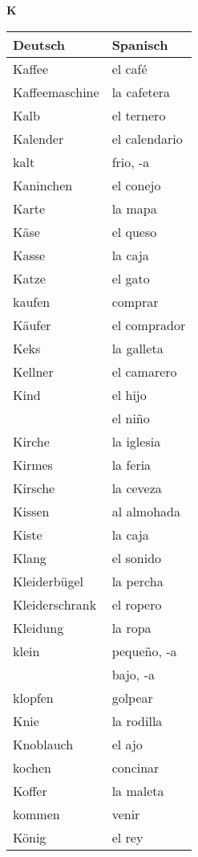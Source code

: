 \begin{flushright}\begin{Huge}\textbf{K}\end{Huge}\end{flushright}

\begin{longtable}{p{} p{}} 
\textbf{Deutsch}     & \textbf{Spanisch}                                       \\ \hline
\hline
\endhead %
Kaffee & el café\\
Kaffeemaschine & la cafetera\\
Kalb & el ternero\\
Kalender & el calendario\\
kalt & frio, -a\\
Kaninchen & el conejo\\
Karte & la mapa\\
Käse & el queso\\
Kasse & la caja\\
Katze & el gato \\
kaufen & comprar\\
Käufer & el comprador\\
Keks & la galleta\\
Kellner & el camarero\\
Kind & el hijo\\
~ & el niño\\
Kirche & la iglesia\\
Kirmes & la feria\\
Kirsche & la ceveza\\
Kissen & al almohada\\
Kiste & la caja\\
Klang & el sonido\\
Kleiderbügel & la percha\\
Kleiderschrank & el ropero\\
Kleidung & la ropa\\
klein & pequeño, -a\\
~ & bajo, -a\\
klopfen & golpear\\
Knie & la rodilla\\
Knoblauch & el ajo\\
kochen & concinar\\
Koffer & la maleta\\
kommen & venir \\
König & el rey\\

\end{longtable}

